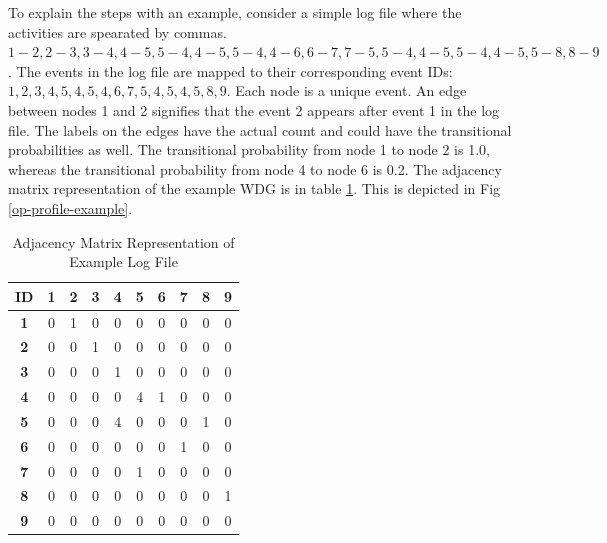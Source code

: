 \begin{enumerate}
To explain the steps with an example, consider a simple log file where the activities are spearated by commas. $1-2, 2-3, 3-4, 4-5, 5-4, 4-5, 5-4, 4-6, 6-7, 7-5, 5-4, 4-5, 5-4, 4-5, 5-8, 8-9$. The events in the log file are mapped to their corresponding event IDs: $1, 2, 3, 4, 5, 4, 5, 4, 6, 7, 5, 4, 5, 4, 5, 8, 9$. Each node is a unique event. An edge between nodes 1 and 2 signifies that the event 2  appears after event 1  in the log file. The labels on the edges have the actual count and could have the transitional probabilities as well. The transitional probability from node 1 to node 2 is 1.0, whereas the transitional probability from node 4 to node 6 is 0.2. The adjacency matrix representation of the example WDG is in table \ref{Adjacency_example_log}. This is depicted in Fig \ref{op-profile-example}.

\begin{table}[!t]
\caption{Adjacency Matrix Representation of Example Log File}
\label{Adjacency_example_log}
\centering
\begin{tabular}{|c|c|c|c|c|c|c|c|c|c|}
\hline
  {\bf ID} &    {\bf 1} &    {\bf 2} &    {\bf 3} &    {\bf 4} &    {\bf 5} &    {\bf 6} &    {\bf 7} &    {\bf 8} &    {\bf 9} \\
\hline
   {\bf 1} &          0 &          1 &          0 &          0 &          0 &          0 &          0 &          0 &          0 \\
\hline
   {\bf 2} &          0 &          0 &          1 &          0 &          0 &          0 &          0 &          0 &          0 \\
\hline
   {\bf 3} &          0 &          0 &          0 &          1 &          0 &          0 &          0 &          0 &          0 \\
\hline
   {\bf 4} &          0 &          0 &          0 &          0 &          4 &          1 &          0 &          0 &          0 \\
\hline
   {\bf 5} &          0 &          0 &          0 &          4 &          0 &          0 &          0 &          1 &          0 \\
\hline
   {\bf 6} &          0 &          0 &          0 &          0 &          0 &          0 &          1 &          0 &          0 \\
\hline
   {\bf 7} &          0 &          0 &          0 &          0 &          1 &          0 &          0 &          0 &          0 \\
\hline
   {\bf 8} &          0 &          0 &          0 &          0 &          0 &          0 &          0 &          0 &          1 \\
\hline
   {\bf 9} &          0 &          0 &          0 &          0 &          0 &          0 &          0 &          0 &          0 \\
\hline
\end{tabular}  
\end{table} 


\end{enumerate}
